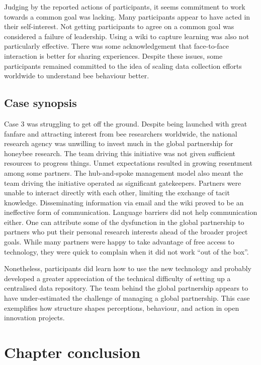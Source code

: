 Judging by the reported actions of participants, it seems commitment to work towards a common goal was lacking. Many participants appear to have acted in their self-interest. Not getting participants to agree on a common goal was considered a failure of leadership. Using a wiki to capture learning was also not particularly effective. There was some acknowledgement that face-to-face interaction is better for sharing experiences. Despite these issues, some participants remained committed to the idea of scaling data collection efforts worldwide to understand bee behaviour better.

\subsection{Case synopsis}

Case 3 was struggling to get off the ground. Despite being launched with great fanfare and attracting interest from bee researchers worldwide, the national research agency was unwilling to invest much in the global partnership for honeybee research. The team driving this initiative was not given sufficient resources to progress things. Unmet expectations resulted in growing resentment among some partners. The hub-and-spoke management model also meant the team driving the initiative operated as significant gatekeepers. Partners were unable to interact directly with each other, limiting the exchange of tacit knowledge. Disseminating information via email and the wiki proved to be an ineffective form of communication. Language barriers did not help communication either. One can attribute some of the dysfunction in the global partnership to partners who put their personal research interests ahead of the broader project goals. While many partners were happy to take advantage of free access to technology, they were quick to complain when it did not work \enquote{out of the box}. \medskip

Nonetheless, participants did learn how to use the new technology and probably developed a greater appreciation of the technical difficulty of setting up a centralised data repository. The team behind the global partnership appears to have under-estimated the challenge of managing a global partnership. This case exemplifies how structure shapes perceptions, behaviour, and action in open innovation projects. 

\section{Chapter conclusion}

